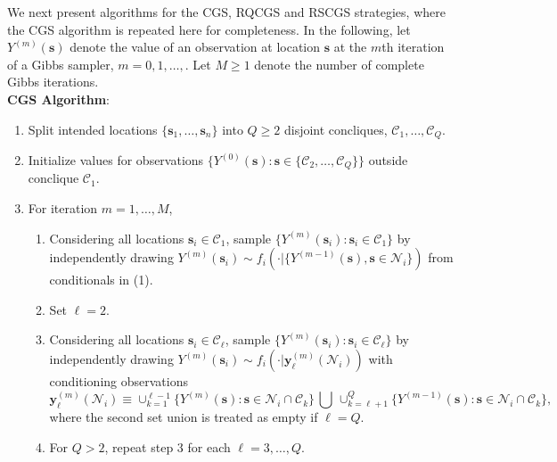 \documentclass[12pt]{article}
\providecommand{\tightlist}{%
  \setlength{\itemsep}{0pt}\setlength{\parskip}{0pt}}
\theoremstyle{definition}
\begin{document}
We next present algorithms for the CGS,  RQCGS and RSCGS strategies,  where the CGS algorithm is repeated here for completeness.
In the following, let \(Y^{(m)}(\boldsymbol s)\) denote the value of an observation at
location \(\boldsymbol s\) at the \(m\)th  iteration of a Gibbs sampler, \(m=0,1,\ldots, \).  Let \(M \geq 1\) denote the
number of complete Gibbs iterations.\\




\noindent \textbf{CGS Algorithm}:  \vspace*{-.2cm}
\begin{enumerate}
\def\labelenumi{\Alph{enumi}.}
\tightlist
\item
  Split intended locations $\{\boldsymbol s_1,\ldots, \boldsymbol s_n\}$ into \(Q \geq 2\) disjoint concliques,
  \(\mathcal{C}_1,\ldots,\mathcal{C}_Q\).
\item
  Initialize  values for observations
  \(\{Y^{(0)}(\boldsymbol s): \boldsymbol s \in \{\mathcal{C}_2, \dots, \mathcal{C}_Q\}\}\) outside conclique $\mathcal{C}_1$.
\item
  For iteration \(m = 1, \dots, M\),
  \begin{enumerate}
  \def\labelenumii{\arabic{enumii}.}
  \tightlist
  \item
    Considering all locations \(\boldsymbol s_i \in \mathcal{C}_1\),
    sample
    \(\{Y^{(m)}(\boldsymbol s_i) : \boldsymbol s_i \in \mathcal{C}_1 \}\)
    by independently drawing
    \(Y^{(m)}(\boldsymbol s_i) \sim f_i(\cdot|\{Y^{(m-1)}(\boldsymbol s), \boldsymbol s \in \mathcal{N}_i\})\)
    from conditionals in (1).
  \item
    Set \(\ell =2\).
    \item Considering all locations
    \(\boldsymbol s_i \in \mathcal{C}_\ell\), sample
    \(\{Y^{(m)}(\boldsymbol s_i): \boldsymbol s_i \in \mathcal{C}_\ell\}\)
    by independently drawing
    \(Y^{(m)}(\boldsymbol s_i) \sim f_i(\cdot|\boldsymbol y_\ell^{(m)}(\mathcal{N}_i))\)
    with conditioning observations
    \[\boldsymbol y_\ell^{(m)}(\mathcal{N}_i) \equiv \cup_{k=1}^{\ell-1} \{ Y^{(m)}(\boldsymbol s):\boldsymbol s \in \mathcal{N}_i \cap \mathcal{C}_k\}\, \bigcup \,\cup_{k=\ell+1}^{Q} \{ Y^{(m-1)}(\boldsymbol s):\boldsymbol s \in \mathcal{N}_i \cap \mathcal{C}_k \},\]
    where the second set union is treated as empty if \(\ell=Q\).
  \item
    For \(Q>2\), repeat step 3 for each \(\ell=3,\ldots,Q\).\\
  \end{enumerate}
\end{enumerate}
\end{document}
